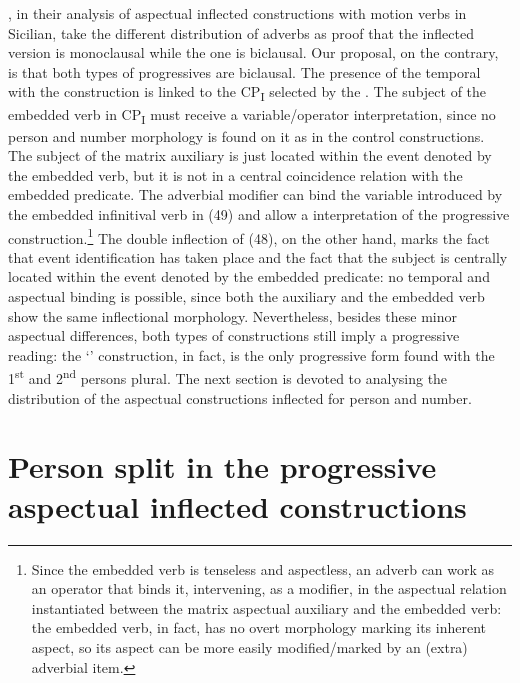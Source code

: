 \documentclass[output=paper]{langsci/langscibook}
\begin{document}
\citet{Cardinaletti2003}, in their analysis of aspectual inflected constructions with motion verbs in Sicilian, take the different distribution of  adverbs as proof that the inflected version is monoclausal while the  one is biclausal. Our proposal, on the contrary, is that both types of progressives are biclausal. The presence of the  temporal  with the  construction is linked to the  CP\textsubscript{I} selected by the  . The subject of the embedded verb in CP\textsubscript{I} must receive a variable\slash operator interpretation, since no person and number morphology is found on it as in the control constructions. The subject of the matrix auxiliary is just located within the event denoted by the embedded verb, but it is not in a central coincidence relation with the embedded predicate. The  adverbial modifier can bind the variable introduced by the embedded infinitival verb in (49) and allow a  interpretation of the progressive  construction.\footnote{Since the embedded verb is tenseless and aspectless, an adverb can work as an operator that binds it, intervening, as a modifier, in the aspectual relation instantiated between the matrix aspectual auxiliary and the embedded verb: the embedded verb, in fact, has no overt morphology marking its inherent aspect, so its aspect can be more easily modified\slash marked by an (extra) adverbial item.} The double inflection of (48), on the other hand, marks the fact that event identification has taken place and the fact that the subject is centrally located within the event denoted by the embedded predicate: no temporal and aspectual binding is possible, since both the auxiliary and the embedded verb show the same inflectional morphology. Nevertheless, besides these minor aspectual differences, both types of constructions still imply a progressive reading: the ‘’ construction, in fact, is the only progressive form found with the 1\textsuperscript{st} and 2\textsuperscript{nd} persons plural. The next section is devoted to analysing the distribution of the aspectual constructions inflected for person and number.

\section{Person split in the progressive aspectual inflected constructions}%
\end{document}
